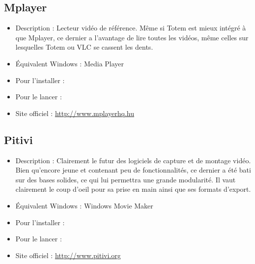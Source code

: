 \subsection{Mplayer}
\begin{itemize}
\begingroup
{}
\item Description : Lecteur vidéo de référence. Même si Totem est mieux intégré à  que Mplayer, ce dernier a l'avantage de lire toutes les vidéos, même celles sur lesquelles Totem ou VLC se cassent les dents.{\par}
\endgroup
\item Équivalent Windows : Media Player{\par}
\item Pour l'installer : 
\item Pour le lancer : 
\item Site officiel : \url{http://www.mplayerhq.hu}{\par}
\end{itemize}
\subsection{Pitivi}
\begin{itemize}
\begingroup
{}
\item Description : Clairement le futur des logiciels de capture et de montage vidéo. Bien qu'encore jeune et contenant peu de fonctionnalités, ce dernier a été bati sur des bases solides, ce qui lui permettra une grande modularité. Il vaut clairement le coup d'oeil pour sa prise en main ainsi que ses formats d'export.{\par}
\endgroup
\item Équivalent Windows : Windows Movie Maker{\par}
\item Pour l'installer : 
\item Pour le lancer : 
\item Site officiel : \url{http://www.pitivi.org}{\par}
\end{itemize}
